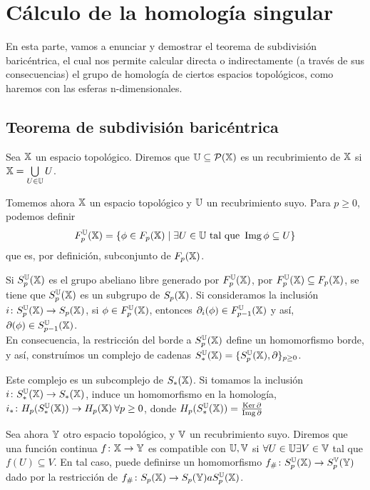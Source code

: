 \chapter{Cálculo de la homología singular}\label{ch:calculoI}

En esta parte, vamos a enunciar y demostrar el teorema de subdivisión baricéntrica,
el cual nos permite calcular directa o indirectamente (a través de sus consecuencias)
el grupo de homología de ciertos espacios topológicos, como haremos con las esferas
n-dimensionales.

\section{Teorema de subdivisión baricéntrica}

\begin{definition}
  Sea ${\mathbb X}$ un espacio topológico. Diremos que ${\mathbb U} \subseteq \mathcal P({\mathbb X})$ es un recubrimiento de ${\mathbb X}$ si ${\mathbb X} = \bigcup\limits_{U \in {\mathbb U}} U$.
\end{definition}

Tomemos ahora ${\mathbb X}$ un espacio topológico y ${\mathbb U}$ un recubrimiento suyo. Para $ p \geq 0$, podemos definir
\[ F_p^{\mathbb U}({\mathbb X}) = \{\phi \in F_p({\mathbb X}) \mid \exists U \in {\mathbb U} \text{ tal que } \operatorname{Img} \phi \subseteq U\} \]
que es, por definición, subconjunto de $F_p({\mathbb X})$.

Si $S_p^{\mathbb U}({\mathbb X})$ es el grupo abeliano libre generado por $F_p^{\mathbb U}({\mathbb X})$, por $F_p^{\mathbb U}({\mathbb X}) \subseteq F_p({\mathbb X})$, se tiene
que $S_p^{\mathbb U}({\mathbb X})$ es un subgrupo de $S_p({\mathbb X})$. Si consideramos la inclusión $i \colon S_p^{\mathbb U}({\mathbb X}) \to S_p({\mathbb X})$, si
$\phi \in F_p^{\mathbb U}({\mathbb X})$, entonces $\partial_i(\phi) \in F_{p-1}^{\mathbb U}({\mathbb X})$ y así, $\partial(\phi) \in S_{p-1}^{\mathbb U}({\mathbb X})$. \\
En consecuencia, la restricción del borde a $S_p^{\mathbb U}({\mathbb X})$ define un homomorfismo borde, y así, construímos un complejo
de cadenas $S_*^{\mathbb U}({\mathbb X}) = \{S_p^{\mathbb U}({\mathbb X}), \partial\}_{p \geq 0}$.

Este complejo es un subcomplejo de $S_*({\mathbb X})$. Si tomamos la inclusión $i \colon S_*^{\mathbb U}({\mathbb X}) \to S_*({\mathbb X})$, induce un
homomorfismo en la homología, $i_* \colon H_p(S_*^{\mathbb U}({\mathbb X})) \to H_p({\mathbb X}) \hspace{0.2em} \forall p \geq 0$, donde
$H_p(S_*^{\mathbb U}({\mathbb X})) = \frac{\operatorname{Ker} \partial}{\operatorname{Img} \partial}$

Sea ahora ${\mathbb Y}$ otro espacio topológico, y ${\mathbb V}$ un recubrimiento suyo. Diremos que una función continua $f \colon {\mathbb X} \to {\mathbb Y}$ es compatible
con ${\mathbb U}, {\mathbb V}$ si $\forall U \in {\mathbb U} \exists V \in {\mathbb V}$ tal que $f(U) \subseteq V$. En tal caso, puede definirse un homomorfismo
$f_\# \colon S_p^{\mathbb U}({\mathbb X}) \to S_p^{\mathbb V}({\mathbb Y})$ dado por la restricción de $f_\# \colon S_{p}({\mathbb X}) \to S_{p}({\mathbb Y}) a S_p^{\mathbb U}({\mathbb X})$.

